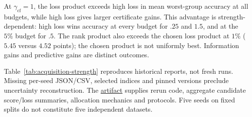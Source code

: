 At $\gamma_{\mathrm{cf}}=1$, the loss product exceeds high loss in mean worst-group accuracy at all budgets, while high loss gives larger certificate gains. This advantage is strength-dependent: high loss wins accuracy at every budget for $.25$ and $1.5$, and at the $5\%$ budget for $.5$. The rank product also exceeds the chosen loss product at $1\%$ ($5.45$ versus $4.52$ points); the chosen product is not uniformly best. Information gains and predictive gains are distinct outcomes.

Table~\ref{tab:acquisition-strength} reproduces historical reports, not fresh runs. Missing per-seed JSON/CSV, selected indices and pinned versions preclude uncertainty reconstruction. The \hyperref[sec:artifact-availability]{artifact} supplies rerun code, aggregate candidate score/loss summaries, allocation mechanics and protocols. Five seeds on fixed splits do not constitute five independent datasets.
\FloatBarrier

